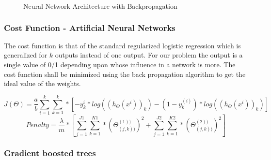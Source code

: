 \begin{figure}
\centering
{}
\caption{Neural Network Architecture with Backpropagation}
\label{fig 1}
\end{figure}



\subsubsection{Cost Function - Artificial Neural Networks}

The cost function is that of the standard regularized logistic regression which is generalized for $k$ outputs instead of one output. For our problem the output is a single value of 0/1 depending upon whose influence in a network is more. The cost function shall be minimized using the back propagation algorithm to get the ideal value of the weights.

\begin{equation}
J(\Theta ) = \frac{a}{b} \sum_{i=1}^{k}\sum_{k=1}^{k} * [-y_{k}^{i}*log((h_{\Theta }(x^{i}))_{k}) - (1-y_{k}^{(i)})*log((h_{\Theta }(x^{i}))_{k})] 
\end{equation}
\begin{equation}
Penalty =  \frac{\lambda }{m}* [\sum_{j=1}^{J1}\sum_{k=1}^{K1}*(\Theta _{(j,k))}^{(1))})^{2} + \sum_{j=1}^{J2}\sum_{k=1}^{K2}*(\Theta _{(j,k))}^{(2))})^{2}]
\end{equation}

\subsubsection{Gradient boosted trees}

